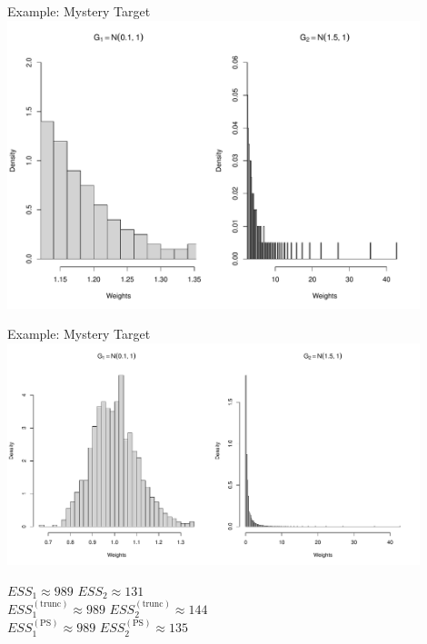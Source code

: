 \documentclass[14pt]{beamer}
\begin{document}
\begin{frame}{Example: Mystery Target}
    \centering
    \includegraphics[height=0.9\textheight, width=0.9\textwidth, keepaspectratio]{Figures/Wt Hist - Pareto Smooth Zoom.pdf}
\end{frame}

\begin{frame}{Example: Mystery Target}
    \centering
    \includegraphics[height=0.5\textheight, width=0.9\textwidth, keepaspectratio]{Figures/Wt Hist - Pareto Smooth.pdf}\newline
    \begin{outline}
        $ESS_1 \approx 989$ \hspace{2.5cm} $ESS_2 \approx 131$\\
        $ESS_1^{(\mathrm{trunc})} \approx 989$ \hspace{2.5cm} $ESS_2^{(\mathrm{trunc})} \approx 144$\\
        $ESS_1^{(\mathrm{PS})} \approx 989$ \hspace{2.5cm} $ESS_2^{(\mathrm{PS})} \approx 135$
    \end{outline}
\end{frame}
\end{document}
